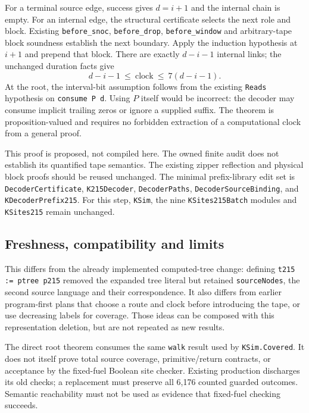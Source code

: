 For a terminal source edge, success gives $d=i+1$ and the internal chain is
empty. For an internal edge, the structural certificate selects the next role
and block. Existing \texttt{before\_snoc}, \texttt{before\_drop},
\texttt{before\_window} and arbitrary-tape block soundness establish the next
boundary. Apply the induction hypothesis at $i+1$ and prepend that block.
There are exactly $d-i-1$ internal links; the unchanged duration facts give
\[
 d-i-1\ \leq\ \mathrm{clock}\ \leq\ 7(d-i-1).
\]
At the root, the interval-bit assumption follows from the existing
\texttt{Reads} hypothesis on \texttt{consume P d}. Using $P$ itself would be
incorrect: the decoder may consume implicit trailing zeros or ignore a
supplied suffix. The theorem is proposition-valued and requires no forbidden
extraction of a computational clock from a general proof.

This proof is proposed, not compiled here. The owned finite audit does not
establish its quantified tape semantics. The existing zipper reflection and
physical block proofs should be reused unchanged.
The minimal prefix-library edit set is \texttt{DecoderCertificate},
\texttt{K215Decoder}, \texttt{DecoderPaths}, \texttt{DecoderSourceBinding},
and \texttt{KDecoderPrefix215}. For this step, \texttt{KSim}, the nine
\texttt{KSites215Batch} modules and \texttt{KSites215} remain unchanged.

\subsection{Freshness, compatibility and limits}
This differs from the already implemented computed-tree change: defining
\texttt{t215 := ptree p215} removed the expanded tree literal but retained
\texttt{sourceNodes}, the second source language and their correspondence.
It also differs from earlier program-first plans that choose a route and clock
before introducing the tape, or use decreasing labels for coverage. Those
ideas can be composed with this representation deletion, but are not repeated
as new results.

The direct root theorem consumes the same \texttt{walk} result used by
\texttt{KSim.Covered}. It does not itself prove total source coverage,
primitive/return contracts, or acceptance by the fixed-fuel Boolean site
checker. Existing production discharges its old checks; a replacement must
preserve all 6,176 counted guarded outcomes. Semantic
reachability must not be used as evidence that fixed-fuel checking succeeds.

